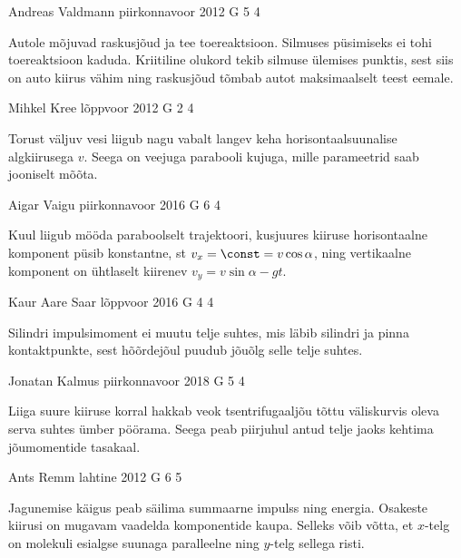 \documentclass[11pt, twoside]{article}
\begin{document}
{%
{Andreas Valdmann} %
{piirkonnavoor} %
{2012} %
{G 5} %
{4} %
{

\ifHint
Autole mõjuvad raskusjõud ja tee toereaktsioon. Silmuses püsimiseks ei tohi toereaktsioon kaduda. Kriitiline olukord tekib silmuse ülemises punktis, sest siis on auto kiirus vähim ning raskusjõud tõmbab autot maksimaalselt teest eemale.
\fi
}

{Mihkel Kree} %
{lõppvoor} %
{2012} %
{G 2} %
{4} %
{

\ifHint
Torust väljuv vesi liigub nagu vabalt langev keha horisontaalsuunalise algkiirusega $v$. Seega on veejuga parabooli kujuga, mille parameetrid saab jooniselt mõõta.
\fi
}

{Aigar Vaigu} %
{piirkonnavoor} %
{2016} %
{G 6} %
{4} %
{

\ifHint
Kuul liigub mööda paraboolselt trajektoori, kusjuures kiiruse horisontaalne komponent püsib konstantne, st $v_x = \const = v\cos\alpha$, ning vertikaalne komponent on ühtlaselt kiirenev $v_y = v\sin\alpha - gt$.
\fi
}

{Kaur Aare Saar} %
{lõppvoor} %
{2016} %
{G 4} %
{4} %
{

\ifHint
Silindri impulsimoment ei muutu telje suhtes, mis läbib silindri ja pinna kontaktpunkte, sest hõõrdejõul puudub jõuõlg selle telje suhtes.
\fi
}

{Jonatan Kalmus} %
{piirkonnavoor} %
{2018} %
{G 5} %
{4} %
{

\ifHint
Liiga suure kiiruse korral hakkab veok tsentrifugaaljõu tõttu väliskurvis oleva serva suhtes ümber pöörama. Seega peab piirjuhul antud telje jaoks kehtima jõumomentide tasakaal.
\fi
}

{Ants Remm} %
{lahtine} %
{2012} %
{G 6} %
{5} %
{

\ifHint
Jagunemise käigus peab säilima summaarne impulss ning energia. Osakeste kiirusi on mugavam vaadelda komponentide kaupa. Selleks võib võtta, et $x$-telg on molekuli esialgse suunaga paralleelne ning $y$-telg sellega risti.
\fi
}

}
\end{document}
